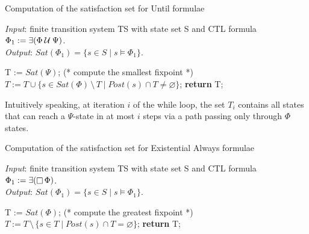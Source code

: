 \documentclass{article}
\begin{document}
\begin{algorithm}[H]
    \caption{Computation of the satisfaction set for Until formulae}
    \hspace*{\algorithmicindent} \emph{Input}: finite transition system TS with state set S and CTL formula $\Phi_1 := \exists (\Phi \mathbin{\mathcal{U}} \Psi)$.\\
    \hspace*{\algorithmicindent} \emph{Output}: $Sat(\Phi_1) = \{ s \in S \mid s \vDash \Phi_1 \}$.
    \begin{algorithmic}[1]
        \State T := $Sat(\Psi)$; (* compute the smallest fixpoint *)
            \State $ T := T \cup \{ s \in Sat(\Phi) \, \setminus \, T \mid Post(s) \cap T \neq \varnothing \} $;
        \EndWhile
    \State \textbf{return} T;
    \end{algorithmic}
\end{algorithm}

Intuitively speaking, at iteration $i$ of the while loop, the set $T_i$ contains all states
that can reach a $\Psi$-state in at most $i$ steps via a path passing only through $\Phi$ states.

\begin{algorithm}[H]
    \caption{Computation of the satisfaction set for Existential Always formulae}
    \hspace*{\algorithmicindent} \emph{Input}: finite transition system TS with state set S and CTL formula $\Phi_1 := \exists (\mathop{\Box} \Phi)$. \\
    \hspace*{\algorithmicindent} \emph{Output}: $Sat(\Phi_1) = \{ s \in S \mid s \vDash \Phi_1 \}$.
    \begin{algorithmic}[1]
        \State T := $Sat(\Phi)$; (* compute the greatest fixpoint *)
            \State $ T := T \, \setminus \, \{ s \in T \mid Post(s) \cap T = \varnothing \} $;
        \EndWhile
    \State \textbf{return} T;
    \end{algorithmic}
\end{algorithm}
\end{document}
